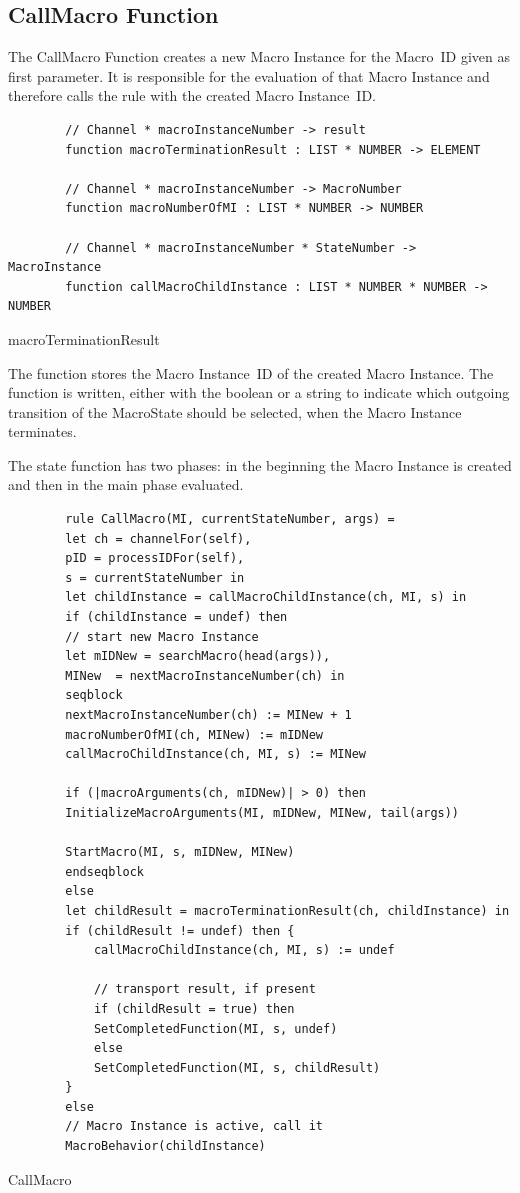 \subsection{CallMacro Function}

The CallMacro Function creates a new Macro Instance for the Macro~ID given as
first parameter. It is responsible for the evaluation of that Macro Instance
and therefore calls the  rule with the created Macro
Instance~ID.

\begin{listing}[H]
	\begin{verbatim}
		// Channel * macroInstanceNumber -> result
		function macroTerminationResult : LIST * NUMBER -> ELEMENT
		
		// Channel * macroInstanceNumber -> MacroNumber
		function macroNumberOfMI : LIST * NUMBER -> NUMBER
		
		// Channel * macroInstanceNumber * StateNumber -> MacroInstance
		function callMacroChildInstance : LIST * NUMBER * NUMBER -> NUMBER
	\end{verbatim}
	\caption{macroTerminationResult}
	\label{lst:shortasm:macroTerminationResult}
\end{listing}

The  function stores the Macro Instance~ID
of the created Macro Instance. The 
function is written, either with the boolean  or a string to
indicate which outgoing transition of the MacroState should be selected, when the
Macro Instance terminates.

The state function has two phases: in the beginning the Macro Instance is created
and then in the main phase evaluated.

\begin{listing}[H]
	\begin{verbatim}
		rule CallMacro(MI, currentStateNumber, args) =
		let ch = channelFor(self),
		pID = processIDFor(self),
		s = currentStateNumber in
		let childInstance = callMacroChildInstance(ch, MI, s) in
		if (childInstance = undef) then
		// start new Macro Instance
		let mIDNew = searchMacro(head(args)),
		MINew  = nextMacroInstanceNumber(ch) in
		seqblock
		nextMacroInstanceNumber(ch) := MINew + 1
		macroNumberOfMI(ch, MINew) := mIDNew
		callMacroChildInstance(ch, MI, s) := MINew
		
		if (|macroArguments(ch, mIDNew)| > 0) then
		InitializeMacroArguments(MI, mIDNew, MINew, tail(args))
		
		StartMacro(MI, s, mIDNew, MINew)
		endseqblock
		else
		let childResult = macroTerminationResult(ch, childInstance) in
		if (childResult != undef) then {
			callMacroChildInstance(ch, MI, s) := undef
			
			// transport result, if present
			if (childResult = true) then
			SetCompletedFunction(MI, s, undef)
			else
			SetCompletedFunction(MI, s, childResult)
		}
		else
		// Macro Instance is active, call it
		MacroBehavior(childInstance)
	\end{verbatim}
	\caption{CallMacro}
	\label{lst:shortasm:CallMacro}
\end{listing}

